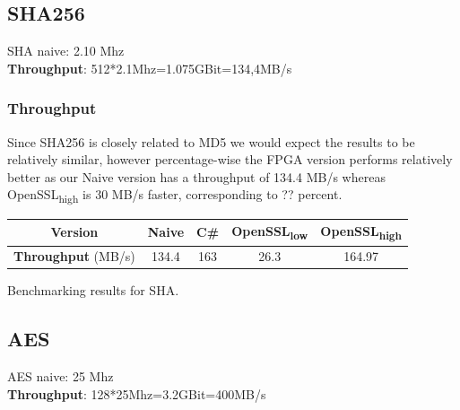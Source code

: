 \documentclass[a4paper]{article}
\begin{document}
\subsection{SHA256}
\label{sec:org8cab03f}
SHA naive: 2.10 Mhz\\
\textbf{Throughput}: 512*2.1Mhz=1.075GBit=134,4MB/s
\subsubsection{Throughput}
\label{sec:orgfc881d8}
Since SHA256 is closely related to MD5 we would expect the results to be relatively similar, however percentage-wise the FPGA version performs relatively better as our Naive version has a throughput of 134.4 MB/s whereas OpenSSL\textsubscript{high} is 30 MB/s faster, corresponding to ?? percent.
\begin{table}[htbp]
\centering
\begin{tabular}{|c|c|c|c|c|}
\hline
\textbf{Version} & Naive & C\# & OpenSSL\textsubscript{low} & OpenSSL\textsubscript{high}\\
\hline
\textbf{Throughput} (MB/s) & 134.4 & 163 & 26.3 & 164.97\\
\hline
\end{tabular}
Benchmarking results for SHA.

\end{table}

\subsection{AES}
\label{sec:orga258acd}
AES naive: 25 Mhz\\
\textbf{Throughput}: 128*25Mhz=3.2GBit=400MB/s
\end{document}
